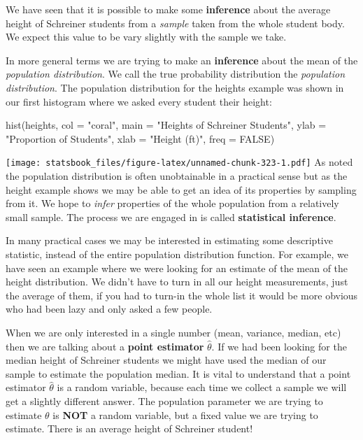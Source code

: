\documentclass[
]{book}
\newenvironment{Shaded}{\begin{snugshade}}{\end{snugshade}}
\newcommand{\AttributeTok}[1]{\textcolor[rgb]{0.77,0.63,0.00}{#1}}
\newcommand{\ConstantTok}[1]{\textcolor[rgb]{0.00,0.00,0.00}{#1}}
\newcommand{\FunctionTok}[1]{\textcolor[rgb]{0.00,0.00,0.00}{#1}}
\newcommand{\NormalTok}[1]{#1}
\newcommand{\StringTok}[1]{\textcolor[rgb]{0.31,0.60,0.02}{#1}}
\theoremstyle{definition}
\theoremstyle{definition}
\theoremstyle{definition}
\theoremstyle{definition}
\theoremstyle{remark}
\begin{document}
We have seen that it is possible to make some \textbf{inference} about the average height of Schreiner students from a \emph{sample} taken from the whole student body. We expect this value to be vary slightly with the sample we take.

In more general terms we are trying to make an \textbf{inference} about the mean of the \emph{population distribution}. We call the true probability distribution the \emph{population distribution}. The population distribution for the heights example was shown in our first histogram where we asked every student their height:

\begin{Shaded}
\begin{Highlighting}[]
\FunctionTok{hist}\NormalTok{(heights, }\AttributeTok{col =} \StringTok{"coral"}\NormalTok{, }\AttributeTok{main =} \StringTok{"Heights of Schreiner Students"}\NormalTok{, }\AttributeTok{ylab =} \StringTok{"Proportion of Students"}\NormalTok{,}
    \AttributeTok{xlab =} \StringTok{"Height (ft)"}\NormalTok{, }\AttributeTok{freq =} \ConstantTok{FALSE}\NormalTok{)}
\end{Highlighting}
\end{Shaded}

\texttt{[image: statsbook\_files/figure-latex/unnamed-chunk-323-1.pdf]}
As noted the population distribution is often unobtainable in a practical sense but as the height example shows we may be able to get an idea of its properties by sampling from it. We hope to \emph{infer} properties of the whole population from a relatively small sample. The process we are engaged in is called \textbf{statistical inference}.

In many practical cases we may be interested in estimating some descriptive statistic, instead of the entire population distribution function. For example, we have seen an example where we were looking for an estimate of the mean of the height distribution. We didn't have to turn in all our height measurements, just the average of them, if you had to turn-in the whole list it would be more obvious who had been lazy and only asked a few people.

When we are only interested in a single number (mean, variance, median, etc) then we are talking about a \textbf{point estimator} \(\hat{\theta}\). If we had been looking for the median height of Schreiner students we might have used the median of our sample to estimate the population median. It is vital to understand that a point estimator \(\hat{\theta}\) is a random variable, because each time we collect a sample we will get a slightly different answer. The population parameter we are trying to estimate \(\theta\) is \textbf{NOT} a random variable, but a fixed value we are trying to estimate. There is an average height of Schreiner student!
\end{document}

